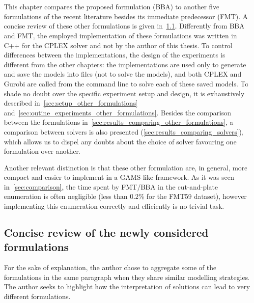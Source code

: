\chapter{\protect{}}
\label{sec:martin_chapter}

This chapter compares the proposed formulation (BBA) to another five formulations of the recent literature besides its immediate predecessor (FMT).
A concise review of these other formulations is given in~\cref{sec:other_formulations}.
Differently from BBA and FMT, the employed implementation of these formulations was written in C++ for the CPLEX solver and not by the author of this thesis.
To control differences between the implementations, the design of the experiments is different from the other chapters: the implementations are used only to generate and save the models into files (not to solve the models), and both CPLEX and Gurobi are called from the command line to solve each of these saved models.
To shade no doubt over the specific experiment setup and design, it is exhaustively described in~\cref{sec:setup_other_formulations} and~\cref{sec:outine_experiments_other_formulations}.
Besides the comparison between the formulations in~\cref{sec:results_comparing_other_formulations}, a comparison between solvers is also presented (\cref{sec:results_comparing_solvers}), which allows us to dispel any doubts about the choice of solver favouring one formulation over another.

Another relevant distinction is that these other formulation are, in general, more compact and easier to implement in a GAMS-like framework.
As it was seen in~\cref{sec:comparison}, the time spent by FMT/BBA in the cut-and-plate enumeration is often negligible (less than 0.2\% for the FMT59 dataset), however implementing this enumeration correctly and efficiently is no trivial task.

\section{Concise review of the newly considered formulations}
\label{sec:other_formulations}

For the sake of explanation, the author chose to aggregate some of the formulations in the same paragraph when they share similar modelling strategies.
The author seeks to highlight how the interpretation of solutions can lead to very different formulations.

